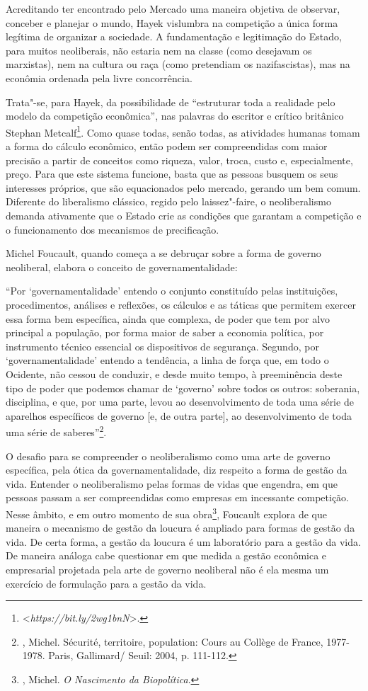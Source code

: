 Acreditando ter encontrado pelo Mercado uma maneira objetiva de
observar, conceber e planejar o mundo, Hayek vislumbra na competição a
única forma legítima de organizar a sociedade. A fundamentação e
legitimação do Estado, para muitos neoliberais, não estaria nem na
classe (como desejavam os marxistas), nem na cultura ou raça (como
pretendiam os nazifascistas), mas na econômia ordenada pela livre
concorrência.

Trata"-se, para Hayek, da possibilidade de ``estruturar toda a realidade
pelo modelo da competição econômica'', nas palavras do escritor e
crítico britânico Stephan Metcalf\footnote{\textless{}\emph{https://bit.ly/2wg1bnN}\textgreater{}.}.
Como quase todas, senão todas, as atividades humanas tomam a forma do
cálculo econômico, então podem ser compreendidas com maior precisão a
partir de conceitos como riqueza, valor, troca, custo e, especialmente,
preço. Para que este sistema funcione, basta que as pessoas busquem os
seus interesses próprios, que são equacionados pelo mercado, gerando um
bem comum. Diferente do liberalismo clássico, regido pelo laissez"-faire,
o neoliberalismo demanda ativamente que o Estado crie as condições que
garantam a competição e o funcionamento dos mecanismos de precificação.

Michel Foucault, quando começa a se debruçar sobre a forma de governo
neoliberal, elabora o conceito de governamentalidade:

``Por `governamentalidade' entendo o conjunto constituído pelas
instituições, procedimentos, análises e reﬂexões, os cálculos e as
táticas que permitem exercer essa forma bem especíﬁca, ainda que
complexa, de poder que tem por alvo principal a população, por forma
maior de saber a economia política, por instrumento técnico essencial os
dispositivos de segurança. Segundo, por `governamentalidade' entendo a
tendência, a linha de força que, em todo o Ocidente, não cessou de
conduzir, e desde muito tempo, à preeminência deste tipo de poder que
podemos chamar de `governo' sobre todos os outros: soberania,
disciplina, e que, por uma parte, levou ao desenvolvimento de toda uma
série de aparelhos especíﬁcos de governo {[}e, de outra parte{]}, ao
desenvolvimento de toda uma série de saberes''\footnote{,
  Michel. Sécurité, territoire, population: Cours au Collège de France,
  1977-1978. Paris, Gallimard/ Seuil: 2004, p. 111-112.}.

O desafio para se compreender o neoliberalismo como uma arte de governo
específica, pela ótica da governamentalidade, diz respeito a forma de
gestão da vida. Entender o neoliberalismo pelas formas de vidas que
engendra, em que pessoas passam a ser compreendidas como empresas em
incessante competição. Nesse âmbito, e em outro momento de sua
obra\footnote{, Michel. \emph{O Nascimento da Biopolítica}.},
Foucault explora de que maneira o mecanismo de gestão da loucura é
ampliado para formas de gestão da vida. De certa forma, a gestão da
loucura é um laboratório para a gestão da vida. De maneira análoga cabe
questionar em que medida a gestão econômica e empresarial projetada pela
arte de governo neoliberal não é ela mesma um exercício de formulação
para a gestão da vida.

